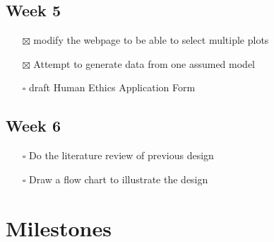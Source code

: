\documentclass[
]{book}
\providecommand{\tightlist}{%
  \setlength{\itemsep}{0pt}\setlength{\parskip}{0pt}}
\begin{document}
\hypertarget{week-5}{%
\section{Week 5}\label{week-5}}

\begin{itemize}
\tightlist
\item[$\boxtimes$]
  modify the webpage to be able to select multiple plots
\item[$\boxtimes$]
  Attempt to generate data from one assumed model
\item[$\square$]
  draft Human Ethics Application Form
\end{itemize}

\hypertarget{week-6}{%
\section{Week 6}\label{week-6}}

\begin{itemize}
\tightlist
\item[$\square$]
  Do the literature review of previous design
\item[$\square$]
  Draw a flow chart to illustrate the design
\end{itemize}

\hypertarget{milestones}{%
\chapter{Milestones}\label{milestones}}

  
\end{document}
